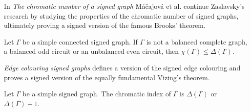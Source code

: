 In \textit{The chromatic number of a signed graph}\cite{chromatic-number} Máčajová et al. continue Zaslavsky's research by studying the properties of the chromatic number of signed graphs, ultimately proving a signed version of the famous Brooks'\cite{brooks} theorem.

\begin{theorem}\label{th:brooks}
    Let $\Gamma$ be a simple connected signed graph. If $\Gamma$ is not a balanced complete graph, a balanced odd circuit or an unbalanced even circuit, then $\chi(\Gamma) \leq \Delta(\Gamma)$.
\end{theorem}

\textit{Edge colouring signed graphs} defines a version of the signed edge colouring and proves a signed version of the equally fundamental Vizing's theorem.

\begin{theorem}\label{th:vizing}
    Let $\Gamma$ be a simple signed graph. The chromatic index of $\Gamma$ is $\Delta(\Gamma)$ or $\Delta(\Gamma) + 1$.
\end{theorem}
